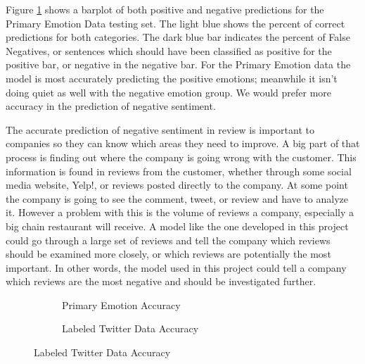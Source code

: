 \documentclass[titlepage,letterpaper]{article}
\begin{document}
Figure \ref{primemresult} shows a barplot of both positive and negative predictions for the Primary Emotion Data testing set. The light blue shows the percent of correct predictions for both categories. The dark blue bar indicates the percent of False Negatives, or sentences which should have been classified as positive for the positive bar, or negative in the negative bar. For the Primary Emotion data the model is most accurately predicting the positive emotions; meanwhile it isn't doing quiet as well with the negative emotion group. We would prefer more accuracy in the prediction of negative sentiment. 

The accurate prediction of negative sentiment in review is important to companies so they can know which areas they need to improve. A big part of that process is finding out where the company is going wrong with the customer. This information is found in reviews from the customer, whether through some social media website, Yelp!, or reviews posted directly to the company. At some point the company is going to see the comment, tweet, or review and have to analyze it. However a problem with this is the volume of reviews a company, especially a big chain restaurant will receive. A model like the one developed in this project could go through a large set of reviews and tell the company which reviews should be examined more closely, or which reviews are potentially the most important. In other words, the model used in this project could tell a company which reviews are the most negative and should be investigated further.   


		
\begin{figure}[]
	\hfill
	\vspace*{-1in}
	\centering
	\begin{adjustwidth}{-.75in}{-.75in}
		
 \begin{subfigure}{3in}
 	\centering
 	\caption{Primary Emotion Accuracy}
	\resizebox{3in}{!}{}
	\label{primemresult}
\end{subfigure}
\hfill
\begin{subfigure}{3in}
	\centering
	\caption{Labeled Twitter Data Accuracy}
	\resizebox{3in}{!}{}
	\label{lbtwitresult}
\end{subfigure}
\hfill
\end{adjustwidth}
\end{figure}
\end{document}
